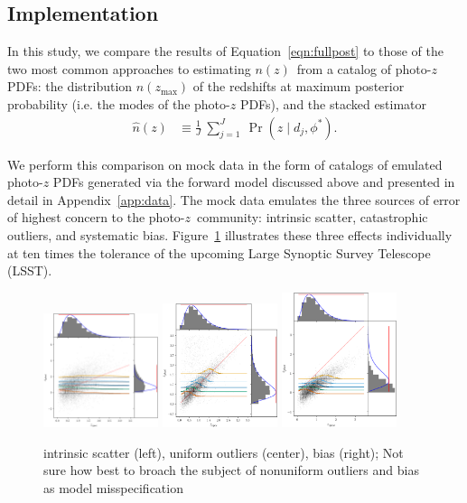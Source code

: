 \documentclass[iop]{emulateapj}
\newcommand{\nz}{$n(z)$}
\newcommand{\pz}{photo-$z$}
\newcommand{\pzpdf}{photo-$z$ PDF}
\begin{document}
\subsection{Implementation}
\label{sec:implementation}

In this study, we compare the results of Equation~\ref{eqn:fullpost} to those of the two most common approaches to estimating \nz\ from a catalog of \pzpdf s: the distribution $n(z_{\mathrm{max}})$ of the redshifts at maximum posterior probability (i.e. the modes of the \pzpdf s), and the stacked estimator
\begin{align}
  \label{eqn:stacked}
  \hat{n}(z) &\equiv \frac{1}{J}\ \sum_{j=1}^{J}\ \Pr(z \mid d_{j}, \phi^{*}) .
\end{align}

We perform this comparison on mock data in the form of catalogs of emulated \pzpdf s generated via the forward model discussed above and presented in detail in Appendix~\ref{app:data}.
The mock data emulates the three sources of error of highest concern to the \pz\ community: intrinsic scatter, catastrophic outliers, and systematic bias.
Figure~\ref{fig:mega_scatter} illustrates these three effects individually at ten times the tolerance of the upcoming Large Synoptic Survey Telescope (LSST).
\begin{figure}
	\begin{center}
		\includegraphics[width=0.3\textwidth]{fig/hivarsigmas_scatter.png}
    	\includegraphics[width=0.3\textwidth]{fig/uouthi_scatter.png}
    	\includegraphics[width=0.3\textwidth]{fig/neghivarbias_scatter.png}
		\caption{intrinsic scatter (left), uniform outliers (center), bias (right);
   		Not sure how best to broach the subject of nonuniform outliers and bias as model misspecification
    	}
		\label{fig:mega_scatter}
	\end{center}
\end{figure}
\end{document}
